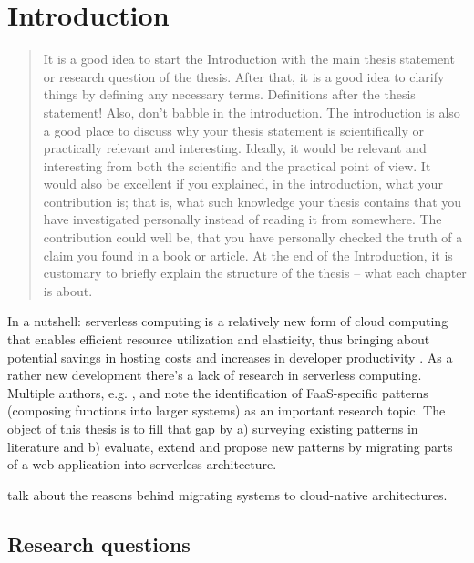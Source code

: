 \documentclass[utf8,english]{gradu3}
\begin{document}
\mainmatter

\chapter{Introduction}

\begin{quote}
It is a good idea to start the Introduction with the main thesis statement or research question of the thesis.  After that, it is a good idea to clarify things by defining any necessary terms. Definitions after the thesis statement!  Also, don't babble in the introduction. The introduction is also a good place to discuss why your thesis statement is scientifically or practically relevant and interesting.  Ideally, it would be relevant and interesting from both the scientific and the practical point of view. It would also be excellent if you explained, in the introduction, what your contribution is; that is, what such knowledge your thesis contains that you have investigated personally instead of reading it from somewhere. The contribution could well be, that you have personally checked the truth of a claim you found in a book or article.  At the end of the Introduction, it is customary to briefly explain the structure of the thesis -- what each chapter is about.
\end{quote}

In a nutshell: serverless computing is a relatively new form of cloud computing that enables efficient resource utilization and elasticity, thus bringing about potential savings in hosting costs and increases in developer productivity \parencite{robert2016serverlessarchitectures}. As a rather new development there's a lack of research in serverless computing. Multiple authors, e.g. \textcite{baldini17currentTrends}, \textcite{fox17} and \textcite{van2017spec} note the identification of FaaS-specific patterns (composing functions into larger systems) as an important research topic. The object of this thesis is to fill that gap by a) surveying existing patterns in literature and b) evaluate, extend and propose new patterns by migrating parts of a web application into serverless architecture.

\textcite{balalaie16migratingcloud} talk about the reasons behind migrating systems to cloud-native architectures.

\section{Research questions}
\end{document}
